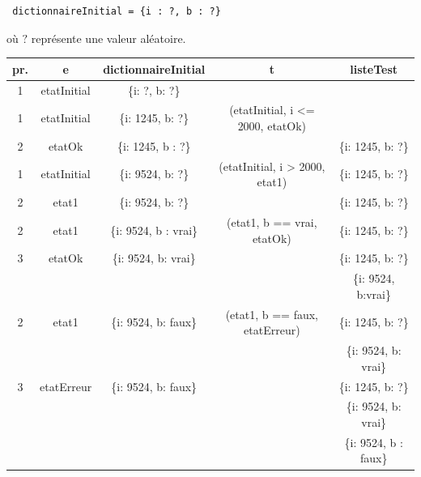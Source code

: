 \begin{verbatim}
 dictionnaireInitial = {i : ?, b : ?}
\end{verbatim}
où $?$ représente une valeur aléatoire.

\begin{table}[H]
 \centering
 \begin{tabular}{|c|c|c|c|c|}
  \hline
  \textbf{pr.} & \textbf{e} & \textbf{dictionnaireInitial} & \textbf{t} 
& \textbf{listeTest} \\
  \hline
  1 & etatInitial & \{i: ?, b: ?\} & & \\
  \hline
  1 & etatInitial & \{i: 1245, b: ?\} & (etatInitial, i <= 2000, etatOk) & \\
  \hline
  2 & etatOk & \{i: 1245, b : ?\} &  & \{i: 1245, b: ?\} \\
  \hline
  1 & etatInitial & \{i: 9524, b: ?\} & (etatInitial, i > 2000, etat1) &
  \{i: 1245, b: ?\}  \\
  \hline
  2 & etat1 & \{i: 9524, b: ?\} & & \{i: 1245, b: ?\} \\
  \hline
  2 & etat1 & \{i: 9524, b : vrai\} & (etat1, b == vrai, etatOk) & \{i: 1245, 
b: ?\} \\
  \hline
  3 & etatOk & \{i: 9524, b: vrai\} &  & \{i: 1245, b: ?\} \\ 
   & & & &\{i: 9524, b:vrai\} \\
  \hline
  2 & etat1 & \{i: 9524, b: faux\} & (etat1, b == faux, etatErreur) & \{i: 
1245, b: ?\}\\
   & & & &\{i: 9524, b: vrai\}\\
  \hline
  3 & etatErreur & \{i: 9524, b: faux\} & & \{i: 1245, b: ?\}\\
   & & & &\{i: 9524, b: vrai\}\\
   & & & &\{i: 9524, b : faux\} \\
\hline
 \end{tabular}

\end{table}

